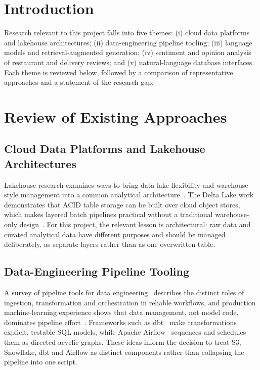 \documentclass[12pt,a4paper]{report}
\begin{document}
\section{Introduction}
Research relevant to this project falls into five themes: (i) cloud data platforms and lakehouse architectures; (ii) data-engineering pipeline tooling; (iii) language models and retrieval-augmented generation; (iv) sentiment and opinion analysis of restaurant and delivery reviews; and (v) natural-language database interfaces. Each theme is reviewed below, followed by a comparison of representative approaches and a statement of the research gap.

\section{Review of Existing Approaches}

\subsection{Cloud Data Platforms and Lakehouse Architectures}
Lakehouse research examines ways to bring data-lake flexibility and warehouse-style management into a common analytical architecture~\cite{ref1,ref7}. The Delta Lake work demonstrates that ACID table storage can be built over cloud object stores, which makes layered batch pipelines practical without a traditional warehouse-only design~\cite{ref8}. For this project, the relevant lesson is architectural: raw data and curated analytical data have different purposes and should be managed deliberately, as separate layers rather than as one overwritten table.

\subsection{Data-Engineering Pipeline Tooling}
A survey of pipeline tools for data engineering~\cite{ref2} describes the distinct roles of ingestion, transformation and orchestration in reliable workflows, and production machine-learning experience shows that data management, not model code, dominates pipeline effort~\cite{ref9}. Frameworks such as dbt~\cite{ref19} make transformations explicit, testable SQL models, while Apache Airflow~\cite{ref18} sequences and schedules them as directed acyclic graphs. These ideas inform the decision to treat S3, Snowflake, dbt and Airflow as distinct components rather than collapsing the pipeline into one script.
\end{document}
